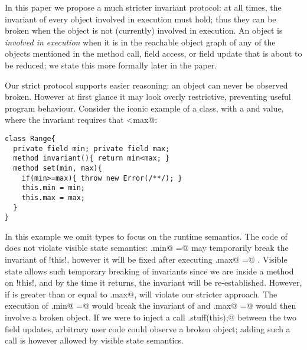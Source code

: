 In this paper we propose a much stricter invariant protocol: at all times, the invariant of every object involved in execution must hold; thus they can be broken when the object is not (currently) involved in execution. 
An object is \emph{involved in execution} when it is in the reachable object graph of any of the objects mentioned in the method call, field access, or field update that is about to be reduced; we state this more formally later in the paper.

Our strict protocol supports easier reasoning: an object can never be observed broken. However 
at first glance it may look overly restrictive, preventing useful program behaviour.
Consider the iconic example of a \Q@Range@ class, with a \Q@min@ and \Q@max@
value, where the invariant requires that \Q@min<max@:
\begin{lstlisting}
class Range{ 
  private field min; private field max;
  method invariant(){ return min<max; }
  method set(min, max){
    if(min>=max){ throw new Error(/**/); }
    this.min = min;
    this.max = max;
  }
}
\end{lstlisting}
In this example we omit types to focus on the runtime semantics.
The code of \Q@set@ does not violate visible state semantics:
\Q@this.min@ \Q@=@ \Q@min@ may temporarily break the invariant of \Q!this!, however it will be fixed after executing \Q@this.max@ \Q@=@ \Q@max@. Visible state allows such temporary breaking of invariants since we are inside a method on \Q!this!, and by the time it returns, the invariant will be re-established.
However, if \Q@min@ is greater than or equal to \Q@this.max@, \Q@set@ will violate our stricter approach. The execution of
\Q@this.min@ \Q@=@ \Q@min@ would break the invariant of \Q@this@ and \Q@this.max@ \Q@=@ \Q@max@ would then involve a broken object. If we were to inject a call
\Q@Do.stuff(this);@ between the two field updates, arbitrary user code could observe a broken object; 
  adding such a call is however allowed by visible state semantics.


